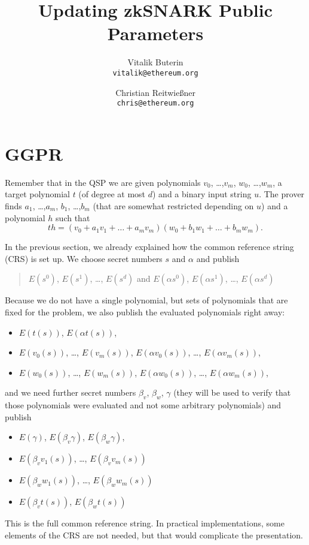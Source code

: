 \documentclass[11pt,letterpaper]{article}
\date{}
\begin{document}


\title{Updating zkSNARK Public Parameters}

\author{Vitalik Buterin\\
{\tt vitalik@ethereum.org}
\and
Christian Reitwießner\\
{\tt chris@ethereum.org}}


\maketitle


\begin{abstract}
\noindent 
\end{abstract}



\section{GGPR}

Remember that in the QSP we are given polynomials $v_{0}$, \dots,$v_{m}$, $w_{0}$, \dots,$w_{m}$, a target polynomial $t$ (of degree at most $d$) and a binary input string $u$. The prover finds $a_{1}$, \dots,$a_{m}$, $b_{1}$, \dots,$b_{m}$ (that are somewhat restricted depending on $u$) and a polynomial $h$ such that
\[
t h = (v_{0} + a_{1}v_{1} +  \dots  + a_{m}v_{m}) (w_{0} + b_{1}w_{1} +  \dots  + b_{m}w_{m}).
\]


In the previous section, we already explained how the common reference string (CRS) is set up. We choose secret numbers $s$ and $\alpha$  and publish
\begin{quote}
$E(s^{0})$, $E(s^{1})$,  \dots, $E(s^{d})$ \quad and \quad $E(\alpha s^{0})$, $E(\alpha s^{1})$,  \dots, $E(\alpha s^{d})$
\end{quote}

Because we do not have a single polynomial, but sets of polynomials that are fixed for the problem, we also publish the evaluated polynomials right away:
\begin{itemize}
\item $E(t(s))$, $E(\alpha  t(s))$,
\item $E(v_{0}(s))$,  \dots, $E(v_{m}(s))$, $E(\alpha  v_{0}(s))$,  \dots, $E(\alpha  v_{m}(s))$,
\item $E(w_{0}(s))$,  \dots, $E(w_{m}(s))$, $E(\alpha  w_{0}(s))$,  \dots, $E(\alpha  w_{m}(s))$,
\end{itemize}


and we need further secret numbers $\beta _{v}$, $\beta _{w}$, $\gamma$  (they will be used to verify that those polynomials were evaluated and not some arbitrary polynomials) and publish
\begin{itemize}
\item $E(\gamma )$, $E(\beta _{v} \gamma )$, $E(\beta _{w} \gamma )$,
\item $E(\beta _{v} v_{1}(s))$,  \dots, $E(\beta _{v} v_{m}(s))$
\item $E(\beta _{w} w_{1}(s))$,  \dots, $E(\beta _{w} w_{m}(s))$
\item $E(\beta _{v} t(s))$, $E(\beta _{w} t(s))$
\end{itemize}


This is the full common reference string. In practical implementations, some elements of the CRS are not needed, but that would complicate the presentation.
\end{document}
